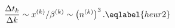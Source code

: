\begin{equation}
\frac{\Delta t_k}{\Delta k}\sim x^{(k)} / \beta^{(k)}
\sim \bigl(n^{(k)}\bigr)^3 \,.
\eqlabel{heur2}
\end{equation}

